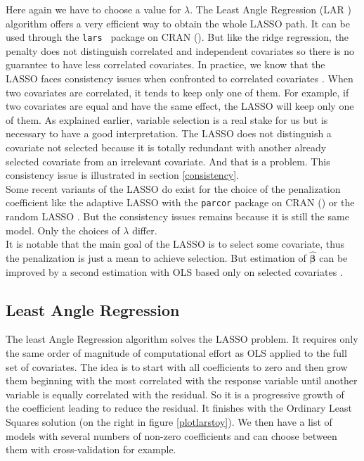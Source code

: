 \documentclass[12pt,a4paper]{report}
\begin{document}
		Here again we have to choose a value for $\lambda$.
	 The Least Angle Regression (\textsc{LAR} \cite{efron2004least}) algorithm offers a very efficient way to obtain the whole LASSO path.  It can be used through the {\tt lars } package on CRAN (\cite{packagelars}). But like the ridge regression, the penalty does not distinguish correlated and independent covariates so there is no guarantee to have less correlated covariates. In practice, we know that the LASSO faces consistency issues when confronted to correlated covariates \cite{Zhao2006MSC}. When two covariates are correlated, it tends to keep only one of them. For example, if two covariates are equal and have the same effect, the LASSO will keep only one of them. As explained earlier, variable selection is a real stake for us but is necessary to have a good interpretation. The LASSO does not distinguish a covariate not selected because it is totally redundant with another already selected covariate from an irrelevant covariate. And that is a problem. This consistency issue is illustrated in section \ref{consistency}.\\



			 Some recent variants of the \textsc{LASSO} do exist for the choice of the penalization coefficient like the adaptive \textsc{LASSO} \cite{zou2006adaptive} with the {\tt parcor} package on CRAN (\cite{packageparcor}) or the random \textsc{LASSO} \cite{wang2011random}.  But the consistency issues remains because it is still the same model. Only the choices of $\lambda$ differ.\\
			 
			 It is notable that the main goal of the LASSO is to select some covariate, thus the penalization is just a mean to achieve selection. But estimation of $\hat{\boldsymbol{\beta}}$ can be improved by a second estimation with OLS based only on selected covariates \cite{SAM10088}.
		\subsection{Least Angle Regression}
		The least Angle Regression algorithm solves the LASSO problem.
		It requires only the same order of magnitude of computational effort as \textsc{OLS} applied to the full set of covariates.
		The idea is to start with all coefficients to zero and then grow them beginning with the most correlated with the response variable until another variable is equally correlated with the residual. So it is a progressive growth of the coefficient leading to reduce the residual. It finishes with the Ordinary Least Squares solution (on the right in figure \ref{plotlarstoy}). We then have a list of models with several numbers of non-zero coefficients and can choose between them with cross-validation for example.\\
		
\end{document}
